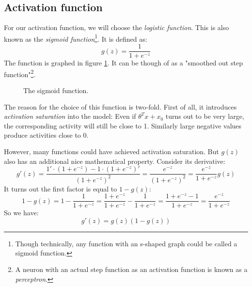 \documentclass[12pt, a4paper]{article}
\numberwithin{equation}{section}
\begin{document}
\subsection{Activation function}
For our activation function, we will choose the \textit{logistic function}. This is also known as the \textit{sigmoid function}\footnote{Though technically, any function with an s-shaped graph could be called a sigmoid function.}. It is defined as:
\begin{equation}
\label{sigmoid}
g(z)=\frac{1}{1+e^{-z}}
\end{equation}
The function is graphed in figure \ref{fig:sigmoid}. It can be though of as a "smoothed out step function"\footnote{A neuron with an actual step function as an activation function is known as a \textit{perceptron}.}.

\begin{figure}
\centering
{}
\caption{The sigmoid function.}
\label{fig:sigmoid}
\end{figure}

The reason for the choice of this function is two-fold. First of all, it introduces \textit{activation saturation} into the model: Even if $\theta^T x+x_0$ turns out to be very large, the corresponding activity will still be close to 1. Similarly large negative values produce activities close to 0.

However, many functions could have achieved activation saturation. But $g(z)$ also has an additional nice mathematical property. Consider its derivative:
\begin{equation}
g'(z)=\frac{1'\cdot(1+e^{-z})-1\cdot(1+e^{-z})'}{(1+e^{-z})^2}=\frac{e^{-z}}{(1+e^{-z})^2}=\frac{e^{-z}}{1+e^{-z}}g(z)
\end{equation}
It turns out the first factor is equal to $1-g(z)$:
\begin{equation}
1-g(z)=1-\frac{1}{1+e^{-z}}=\frac{1+e^{-z}}{1+e^{-z}}-\frac{1}{1+e^{-z}}=\frac{1+e^{-z}-1}{1+e^{-z}}=\frac{e^{-z}}{1+e^{-z}}
\end{equation}
So we have:
\begin{equation}
\label{sigmoid_derivative}
g'(z)=g(z)\left(1-g(z)\right)
\end{equation}
\end{document}

